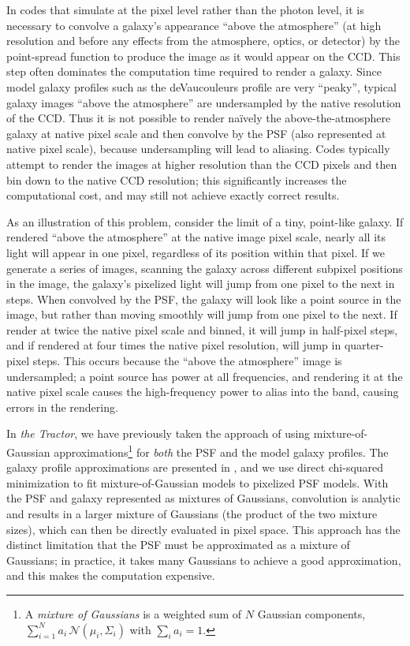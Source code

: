 \documentclass[11pt,preprint]{aastex}
\newcommand{\project}[1]{\textsl{#1}}
\begin{document}

In codes that simulate at the pixel level rather than the photon
level, it is necessary to convolve a galaxy's appearance ``above the
atmosphere'' (at high resolution and before any effects from the
atmosphere, optics, or detector) by the point-spread function to
produce the image as it would appear on the CCD.  This step often
dominates the computation time required to render a galaxy.  Since
model galaxy profiles such as the deVaucouleurs profile are very
``peaky'', typical galaxy images ``above the atmosphere'' are
undersampled by the native resolution of the CCD.  Thus it is not
possible to render na\"ively the above-the-atmosphere galaxy at native
pixel scale and then convolve by the PSF (also represented at native
pixel scale), because undersampling will lead to aliasing.
Codes typically attempt to render the images at higher resolution than the
CCD pixels and then bin down to the native CCD resolution; this
significantly increases the computational cost, and may still not
achieve exactly correct results.



As an illustration of this problem, consider the limit of a tiny,
point-like galaxy.  If rendered ``above the atmosphere'' at the native
image pixel scale, nearly all its light will appear in one pixel,
regardless of its position within that pixel.  If we generate a series
of images, scanning the galaxy across different subpixel positions in
the image, the galaxy's pixelized light will jump from one pixel to
the next in steps.  When convolved by the PSF, the galaxy will look
like a point source in the image, but rather than moving smoothly will
jump from one pixel to the next.  If render at twice the native pixel
scale and binned, it will jump in half-pixel steps, and if rendered at
four times the native pixel resolution, will jump in quarter-pixel
steps.  This occurs because the ``above the atmosphere'' image is
undersampled; a point source has power at all frequencies, and
rendering it at the native pixel scale causes the high-frequency power
to alias into the band, causing errors in the rendering.


In \project{the Tractor}, we have previously taken the approach of
using mixture-of-Gaussian approximations\footnote{
  A \emph{mixture of Gaussians} is a weighted sum of $N$ Gaussian
  components, $\sum_{i=1}^N a_i \, \mathcal{N}(\mu_i, \Sigma_i)$
  with $\sum_i a_i = 1$.}
for \emph{both} the PSF and
the model galaxy profiles.  The galaxy profile approximations are
presented in \cite{moggalaxy}, and we use direct chi-squared
minimization to fit mixture-of-Gaussian models to pixelized PSF
models.  With the PSF and galaxy represented as mixtures of Gaussians,
convolution is analytic and results in a larger mixture of Gaussians
(the product of the two mixture sizes), which can then be directly
evaluated in pixel space.  This approach has the distinct limitation
that the PSF must be approximated as a mixture of Gaussians; in
practice, it takes many Gaussians to achieve a good approximation, and
this makes the computation expensive.
\end{document}
